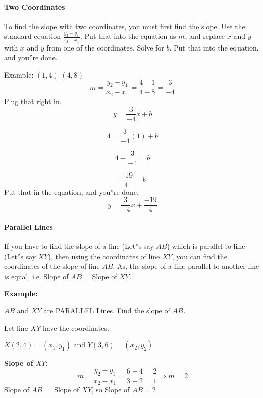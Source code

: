 \paragraph{Two Coordinates}



To find the slope with two coordinates, you must first find the slope. Use the standard equation $\frac{y_2 - y_1}{x_2 - x_1}$. Put that into the equation as $m$, and replace $x$ and $y$ with $x$ and $y$ from one of the coordinates. Solve for $b$. Put that into the equation, and you''re done.



Example: $(1, 4)$ $(4, 8)$
$$
m = \frac{y_2 - y_1}{x_2 - x_1} = \frac{4 - 1}{4 - 8} = \frac{3}{-4}
$$
Plug that right in.
$$
y = \frac{3}{-4}x + b
$$



$$
4 = \frac{3}{-4}(1) + b
$$



$$
4 - \frac{3}{-4} = b
$$



$$
\frac{-19}{4} = b
$$
Put that in the equation, and you''re done.
$$
y = \frac{3}{-4}x + \frac{-19}{4}
$$
\paragraph{Parallel Lines}



If you have to find the slope of a line (Let''s say $AB$) which is parallel to line (Let''s say $XY$), then using the coordinates of line $XY$, you can find the coordinates of the slope of line $AB$. As, the slope of a line parallel to another line is equal, i.e. Slope of $AB$ = Slope of $XY$.



\textbf{Example:}



$AB$ and $XY$ are PARALLEL Lines. Find the slope of $AB$.



Let line $XY$ have the coordinates:



$X(2, 4) = (x_1, y_1)$ and $Y(3, 6) = (x_2, y_2)$



\textbf{Slope of $XY$:}
$$
m = \frac{y_2 - y_1}{x_2 - x_1} = \frac{6 - 4}{3 - 2} = \frac{2}{1} \Rightarrow m = 2
$$
Slope of $AB = $ Slope of $XY$, so Slope of $AB = 2$



